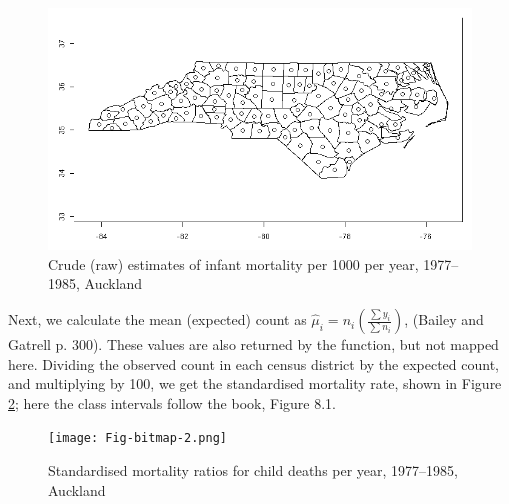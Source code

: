 \documentclass[a4paper,10pt]{article}
\begin{document}
\begin{figure}[htbp]
\begin{center} 
\includegraphics{Fig-bitmap-1.png}\end{center}
\caption{Crude (raw) estimates of infant mortality per 1000 per year, 1977--1985, Auckland}
\label{raw}
\end{figure}


\begin{footnotesize}
\begin{Schunk}
\end{Schunk}
\begin{Schunk}
\end{Schunk}
\end{footnotesize}
Next, we calculate the mean (expected) count as $\hat{\mu}_i = n_i ( )$, (Bailey and Gatrell p. 300). These values are also returned by the function, but not mapped here. Dividing the observed count in each census district by the expected count, and multiplying by 100, we get the standardised mortality rate, shown in Figure \ref{rel}; here the class intervals follow the book, Figure 8.1.

\begin{figure}[htbp]
\begin{center} 
\texttt{[image: Fig-bitmap-2.png]}\end{center}
\caption{Standardised mortality ratios for child deaths per year, 1977--1985, Auckland}
\label{rel}
\end{figure}
\end{document}
